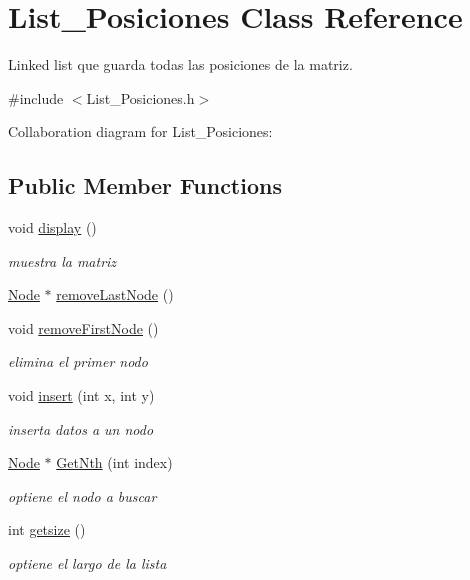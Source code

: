 \hypertarget{classList__Posiciones}{}\section{List\+\_\+\+Posiciones Class Reference}
\label{classList__Posiciones}


Linked list que guarda todas las posiciones de la matriz.  




{\ttfamily \#include $<$List\+\_\+\+Posiciones.\+h$>$}



Collaboration diagram for List\+\_\+\+Posiciones\+:
\subsection*{Public Member Functions}
\begin{DoxyCompactItemize}
\item 
void \hyperlink{classList__Posiciones_a910b5a43c3e371a026dc182617a6a20c}{display} ()
\begin{DoxyCompactList}\small\item\em muestra la matriz \end{DoxyCompactList}\item 
\hyperlink{classNode}{Node} $\ast$ \hyperlink{classList__Posiciones_a44902a273edd12fa779341f7dbd0f4f1}{remove\+Last\+Node} ()
\item 
void \hyperlink{classList__Posiciones_aa826398d2e34a0ccb1b4d0a91e06da30}{remove\+First\+Node} ()
\begin{DoxyCompactList}\small\item\em elimina el primer nodo \end{DoxyCompactList}\item 
void \hyperlink{classList__Posiciones_a90096ef7143e1d44c48d589af6f1e94c}{insert} (int x, int y)
\begin{DoxyCompactList}\small\item\em inserta datos a un nodo \end{DoxyCompactList}\item 
\hyperlink{classNode}{Node} $\ast$ \hyperlink{classList__Posiciones_adc4bc1ffeea86fde520563bc165f4e4b}{Get\+Nth} (int index)
\begin{DoxyCompactList}\small\item\em optiene el nodo a buscar \end{DoxyCompactList}\item 
int \hyperlink{classList__Posiciones_ac21ed6aafc1319876f938ef0cf7a1b60}{getsize} ()
\begin{DoxyCompactList}\small\item\em optiene el largo de la lista \end{DoxyCompactList}\end{DoxyCompactItemize}
